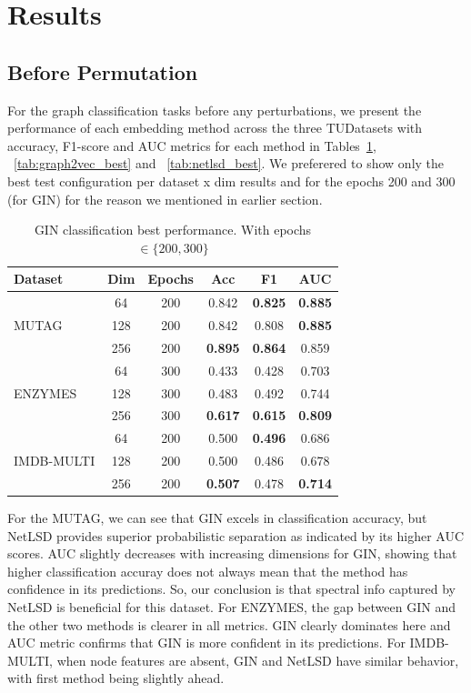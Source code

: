 \section{Results}
\subsection{Before Permutation}
 
For the graph classification tasks before any perturbations, we present the performance of each 
embedding method across the three TUDatasets with accuracy, F1-score and AUC metrics for each method in Tables~\ref{tab:gin_best}, ~\ref{tab:graph2vec_best} and ~\ref{tab:netlsd_best}. 
We preferered to show only the best test configuration per dataset x dim results 
and for the epochs 200 and 300 (for GIN) for the reason we mentioned in earlier section.



\begin{table}
\centering
\begin{tabular}{l c c c c c}
\hline
\textbf{Dataset} & \textbf{Dim} & \textbf{Epochs} & \textbf{Acc} & \textbf{F1} & \textbf{AUC} \\
\hline
     & 64  & 200 & 0.842 & \textbf{0.825} & \textbf{0.885} \\
MUTAG      & 128 & 200 & 0.842 & 0.808 & \textbf{0.885} \\
      & 256 & 200 & \textbf{0.895} & \textbf{0.864} & 0.859 \\
\hline
    & 64  & 300 & 0.433 & 0.428 & 0.703 \\
ENZYMES    & 128 & 300 & 0.483 & 0.492 & 0.744 \\
  & 256 & 300 & \textbf{0.617} & \textbf{0.615} & \textbf{0.809} \\
\hline
 & 64  & 200 & 0.500 & \textbf{0.496} & 0.686 \\
IMDB-MULTI & 128 & 200 & 0.500 & 0.486 & 0.678 \\
 & 256 & 200 & \textbf{0.507} & 0.478 & \textbf{0.714} \\
\hline
\end{tabular}
\caption{GIN classification best performance. With epochs $\in \{200,300\}$}
\label{tab:gin_best}
\end{table}



For the MUTAG, we can see that GIN excels in classification accuracy, but NetLSD provides 
superior probabilistic separation as indicated by its higher AUC scores. 
AUC slightly decreases with increasing dimensions for GIN, showing that 
higher classification accuray does not always mean that the method 
has confidence in its predictions. 
So, our conclusion is that spectral info captured by NetLSD is beneficial for this dataset.
For ENZYMES, the gap between GIN and the other two methods is clearer in all metrics.
GIN clearly dominates here and AUC metric confirms that GIN is more confident in its predictions.
For IMDB-MULTI, when node features are absent, GIN and NetLSD have similar behavior, with first method being slightly ahead.


